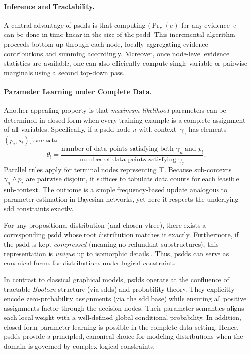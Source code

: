 \paragraph{Inference and Tractability.} A central advantage of \acrshort{psdd}s is that computing $(\Pr_r(e)$ for any evidence~$e$ can be done in time linear in the size of the \acrshort{psdd}.  This incremental algorithm proceeds bottom-up through each node, locally aggregating evidence contributions and summing accordingly.  Moreover, once node-level evidence statistics are available, one can also efficiently compute single-variable or pairwise marginals using a second top-down pass.

\paragraph{Parameter Learning under Complete Data.} Another appealing property is that \emph{maximum-likelihood} parameters can be determined in closed form when every training example is a complete assignment of all variables.  Specifically, if a \acrshort{psdd} node $n$ with context~$\gamma_n$ has elements $(p_i, s_i)$, one sets
\[
\theta_i = \frac{\text{number of data points satisfying both } \gamma_n \text{ and } p_i}
{\text{number of data points satisfying } \gamma_n}.
\]
Parallel rules apply for terminal nodes representing $\top$.  Because sub-contexts $\gamma_n \wedge p_i$ are pairwise disjoint, it suffices to tabulate data counts for each feasible sub-context.  The outcome is a simple frequency-based update analogous to parameter estimation in Bayesian networks, yet here it respects the underlying \acrshort{sdd} constraints exactly.

For any propositional distribution (and chosen vtree), there exists a corresponding \acrshort{psdd} whose root distribution matches it exactly.  Furthermore, if the \acrshort{psdd} is kept \emph{compressed} (meaning no redundant substructures), this representation is \emph{unique} up to isomorphic details \cite{darwiche_knowledge_2002}.  Thus, \acrshort{psdd}s can serve as canonical forms for distributions under logical constraints.

In contrast to classical graphical models, \acrshort{psdd}s operate at the confluence of tractable \emph{Boolean} structure (via \acrshort{sdd}s) and probability theory.  They explicitly encode zero-probability assignments (via the \acrshort{sdd} base) while ensuring all positive assignments factor through the decision nodes.  Their parameter semantics aligns each local weight with a well-defined global conditional probability.  In addition, closed-form parameter learning is possible in the complete-data setting.  Hence, \acrshort{psdd}s provide a principled, canonical choice for modeling distributions when the domain is governed by complex logical constraints.